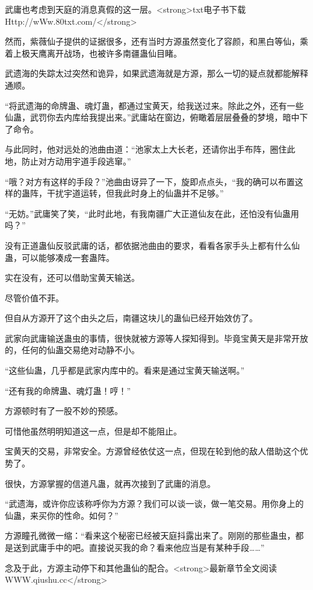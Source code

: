 
\begin{this_body}

武庸也考虑到天庭的消息真假的这一层。<strong>txt电子书下载Http://wWw.80txt.com/</strong>

然而，紫薇仙子提供的证据很多，还有当时方源虽然变化了容颜，和黑白等仙，乘着上极天鹰离开战场，也被许多南疆蛊仙目睹。

武遗海的失踪太过突然和诡异，如果武遗海就是方源，那么一切的疑点就都能解释通顺。

“将武遗海的命牌蛊、魂灯蛊，都通过宝黄天，给我送过来。除此之外，还有一些仙蛊，武罚你去内库给我提出来。”武庸站在窗边，俯瞰着层层叠叠的梦境，暗中下了命令。

与此同时，他对远处的池曲由道：“池家太上大长老，还请你出手布阵，圈住此地，防止对方动用宇道手段逃窜。”

“哦？对方有这样的手段？”池曲由讶异了一下，旋即点点头，“我的确可以布置这样的蛊阵，干扰宇道运转，但我此时身上的仙蛊并不足够。”

“无妨。”武庸笑了笑，“此时此地，有我南疆广大正道仙友在此，还怕没有仙蛊用吗？”

没有正道蛊仙反驳武庸的话，都依据池曲由的要求，看看各家手头上都有什么仙蛊，可以能够凑成一套蛊阵。

实在没有，还可以借助宝黄天输送。

尽管价值不菲。

但自从方源开了这个由头之后，南疆这块儿的蛊仙已经开始效仿了。

武家向武庸输送蛊虫的事情，很快就被方源等人探知得到。毕竟宝黄天是非常开放的，任何的仙蛊交易绝对动静不小。

“这些仙蛊，几乎都是武家内库中的。看来是通过宝黄天输送啊。”

“还有我的命牌蛊、魂灯蛊！哼！”

方源顿时有了一股不妙的预感。

可惜他虽然明明知道这一点，但是却不能阻止。

宝黄天的交易，非常安全。方源曾经依仗这一点，但现在轮到他的敌人借助这个优势了。

很快，方源掌握的信道凡蛊，就再次接到了武庸的消息。

“武遗海，或许你应该称呼你为方源？我们可以谈一谈，做一笔交易。用你身上的仙蛊，来买你的性命。如何？”

方源瞳孔微微一缩：“看来这个秘密已经被天庭抖露出来了。刚刚的那些蛊虫，都是送到武庸手中的吧。直接说买我的命？看来他应当是有某种手段……”

念及于此，方源主动停下和其他蛊仙的配合。<strong>最新章节全文阅读WWW.qiushu.cc</strong>


\end{this_body}
